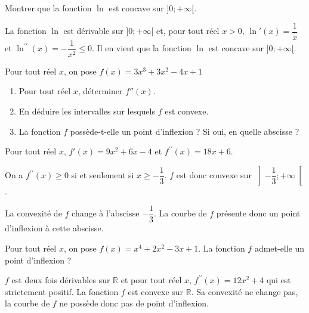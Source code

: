 \documentclass[11pt,fleqn, openany]{book} %
\begin{document}
\begin{exercise}Montrer que la fonction $\ln$ est concave sur $]0;+\infty[$.\end{exercise}

\begin{solution}La fonction \(\ln\) est dérivable sur \(]0;+\infty[\) et, pour tout réel \(x>0\), \(\ln '(x)=\dfrac{1}{x}\) et \(\ln^{\prime\prime}(x)=-\dfrac{1}{x^2}\leqslant 0\). Il en vient que la fonction \(\ln\) est concave sur \(]0;+\infty[\).\end{solution}



\begin{exercise}Pour tout réel $x$, on pose $f(x)=3x^3+3x^2-4x+1$
\begin{enumerate}
\item Pour tout réel $x$, déterminer $f''(x)$.
\item En déduire les intervalles sur lesquels $f$ est convexe.
\item La fonction $f$ possède-t-elle un point d'inflexion ? Si oui, en quelle abscisse ?
\end{enumerate}\end{exercise}

\begin{solution}
Pour tout réel \(x\), \(f'(x)=9x^2+6x-4\) et \(f^{\prime\prime}(x)=18x+6\).

On a \(f^{\prime\prime}(x)\geqslant 0\) si et seulement si \(x \geqslant - \dfrac{1}{3}\). \(f\) est donc convexe sur \(\left]-\dfrac{1}{3};+\infty\right[\).

La convexité de \(f\) change à l'abscisse \(-\dfrac{1}{3}\). La courbe de \(f\) présente donc un point d'inflexion à cette abscisse.\end{solution}



\begin{exercise}Pour tout réel $x$, on pose $f(x)=x^4+2x^2-3x+1$. La fonction $f$ admet-elle un point d'inflexion ?\newpage \end{exercise}

\begin{solution}
\(f\) est deux fois dérivables sur \(\mathbb{R}\) et pour tout réel \(x\), \(f^{\prime\prime}(x)=12x^2+4\) qui est strictement positif. La fonction \(f\) est convexe sur \(\mathbb{R}\). Sa convexité ne change pas, la courbe de \(f\) ne possède donc pas de point d'inflexion.\end{solution}
\end{document}
